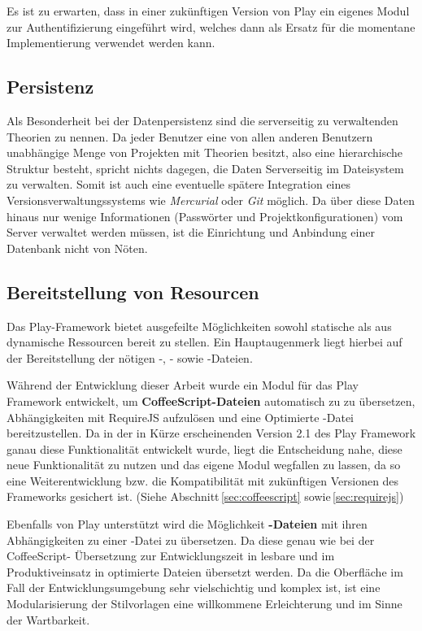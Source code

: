Es ist zu erwarten, dass in einer zukünftigen Version von Play ein eigenes Modul zur
Authentifizierung eingeführt wird, welches dann als Ersatz für die momentane Implementierung
verwendet werden kann.

\subsection{Persistenz}

Als Besonderheit bei der Datenpersistenz sind die serverseitig zu verwaltenden Theorien zu nennen.
Da jeder Benutzer eine von allen anderen Benutzern unabhängige Menge von Projekten mit Theorien
besitzt, also eine hierarchische Struktur besteht, spricht nichts dagegen, die Daten Serverseitig im
Dateisystem zu verwalten. Somit ist auch eine eventuelle spätere Integration eines
Versionsverwaltungssystems wie \textit{Mercurial} oder \textit{Git} möglich. Da über diese Daten
hinaus nur wenige Informationen (Passwörter und Projektkonfigurationen) vom Server verwaltet werden
müssen, ist die Einrichtung und Anbindung einer Datenbank nicht von Nöten.

\subsection{Bereitstellung von Resourcen}

Das Play-Framework bietet ausgefeilte Möglichkeiten sowohl statische als aus dynamische Ressourcen
bereit zu stellen. Ein Hauptaugenmerk liegt hierbei auf der Bereitstellung der nötigen -,
- sowie -Dateien.

Während der Entwicklung dieser Arbeit wurde ein Modul für das Play Framework entwickelt, um \textbf
{CoffeeScript-Dateien} automatisch zu  zu übersetzen, Abhängigkeiten mit RequireJS
aufzulösen und eine Optimierte -Datei bereitzustellen. Da in der in Kürze erscheinenden
Version 2.1 des Play Framework ganau diese Funktionalität entwickelt wurde, liegt die Entscheidung
nahe, diese neue Funktionalität zu nutzen und das eigene Modul wegfallen zu lassen, da so eine
Weiterentwicklung bzw. die Kompatibilität mit zukünftigen Versionen des Frameworks gesichert ist.
(Siehe Abschnitt\,\ref{sec:coffeescript} sowie\,\ref{sec:requirejs})

Ebenfalls von Play unterstützt wird die Möglichkeit  \textbf{-Dateien} mit ihren
Abhängigkeiten zu einer -Datei zu übersetzen. Da diese genau wie bei der CoffeeScript-
Übersetzung zur Entwicklungszeit in lesbare und im Produktiveinsatz in optimierte Dateien übersetzt
werden. Da die Oberfläche im Fall der Entwicklungsumgebung sehr vielschichtig und komplex ist, ist
eine Modularisierung der Stilvorlagen eine willkommene Erleichterung und im Sinne der Wartbarkeit.

